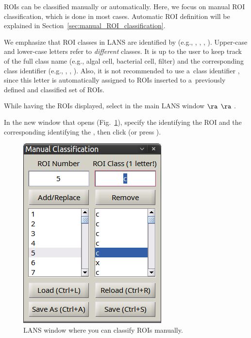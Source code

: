 ROIs can be classified manually or automatically. Here, we focus on manual ROI classification, which is done in most cases. Automatic ROI definition will be explained in Section~\ref{sec:manual_ROI_classification}.

We emphasize that ROI classes in LANS are identified by  (e.g., , , , ). Upper-case and lower-case letters refer to \emph{different} classes. It is up to the user to keep track of the full class name (e.g., algal cell, bacterial cell, filter) and the corresponding class identifier (e.g., , , ). Also, it is not recommended to use a~class identifier , since this letter is automatically assigned to ROIs inserted to a~previously defined and classified set of ROIs.

\setcounter{step}{0}

\s While having the ROIs displayed, select in the main LANS window  $\ra$  $\ra$ .

\s In the new window that opens (Fig.~\ref{fig:roi-classification}), specify the  identifying the ROI and the corresponding  identifying the , then click  (or press ).

\begin{figure}[!ht]
\centering
\includegraphics[scale=0.4]{figs3/LANS-roi-classification}
\caption{\label{fig:roi-classification}%
LANS window where you can classify ROIs manually.}
\end{figure}

